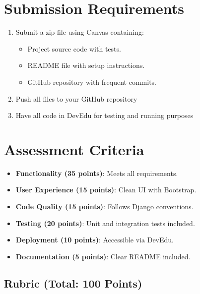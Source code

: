 \documentclass{article}
\begin{document}
\section{Submission Requirements}
\begin{enumerate}
    \item Submit a zip file using Canvas containing: \begin{itemize}
        \item Project source code with tests.
        \item README file with setup instructions.
        \item GitHub repository with frequent commits.
\end{itemize}
    \item Push all files to your GitHub repository
    \item Have all code in DevEdu for testing and running purposes
\end{enumerate}

\section{Assessment Criteria}
\begin{itemize}
    \item \textbf{Functionality (35 points)}: Meets all requirements.
    \item \textbf{User Experience (15 points)}: Clean UI with Bootstrap.
    \item \textbf{Code Quality (15 points)}: Follows Django conventions.
    \item \textbf{Testing (20 points)}: Unit and integration tests included.
    \item \textbf{Deployment (10 points)}: Accessible via DevEdu.
    \item \textbf{Documentation (5 points)}: Clear README included.
\end{itemize}
\newpage 
\subsection{Rubric (Total: 100 Points)}
\end{document}
